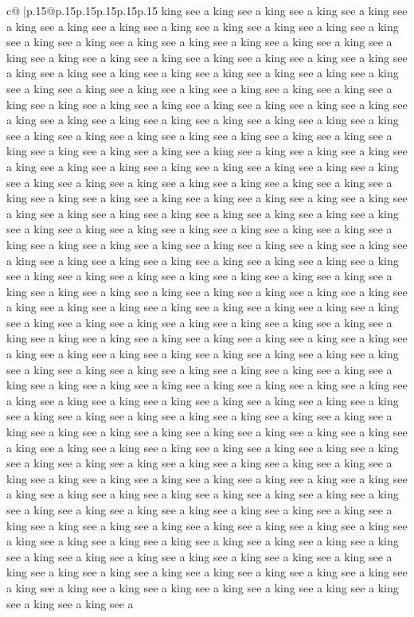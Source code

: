 \documentclass{article}
\begin{document}
{\begin{supertabular}{c@{$\;$}|p{.15\linewidth}@{}p{.15\linewidth}p{.15\linewidth}p{.15\linewidth}p{.15\linewidth}p{.15\linewidth}}
{{{king see a king see a king see a king see a king see a king see a king see a king see a king see a king see a king see a king see a king see a king see a king see a king see a king see a king see a king see a king see a king see a king see a king see a king see a king see a king see a king see a king see a king see a king see a king see a king see a king see a king see a king see a king see a king see a king see a king see a king see a king see a king see a king see a king see a king see a king see a king see a king see a king see a king see a king see a king see a king see a king see a king see a king see a king see a king see a king see a king see a king see a king see a king see a king see a king see a king see a king see a king see a king see a king see a king see a king see a king see a king see a king see a king see a king see a king see a king see a king see a king see a king see a king see a king see a king see a king see a king see a king see a king see a king see a king see a king see a king see a king see a king see a king see a king see a king see a king see a king see a king see a king see a king see a king see a king see a king see a king see a king see a king see a king see a king see a king see a king see a king see a king see a king see a king see a king see a king see a king see a king see a king see a king see a king see a king see a king see a king see a king see a king see a king see a king see a king see a king see a king see a king see a king see a king see a king see a king see a king see a king see a king see a king see a king see a king see a king see a king see a king see a king see a king see a king see a king see a king see a king see a king see a king see a king see a king see a king see a king see a king see a king see a king see a king see a king see a king see a king see a king see a king see a king see a king see a king see a king see a king see a king see a king see a king see a king see a king see a king see a king see a king see a king see a king see a king see a king see a king see a king see a king see a king see a king see a king see a king see a king see a king see a king see a king see a king see a king see a king see a king see a king see a king see a king see a king see a king see a king see a king see a king see a king see a king see a king see a king see a king see a king see a king see a king see a king see a king see a king see a king see a king see a king see a king see a king see a king see a king see a king see a king see a king see a king see a king see a king see a king see a king see a king see a king see a king see a king see a king see a king see a king see a king see a king see a king see a king see a king see a king see a king see a king see a king see a king see a king see a king see a king see a king see a king see a king see a king see a king see a king see a king see a king see a king see a king see a king see a king see a king see a king see a king see a king see a king see a king see a king see a king see a king see a king see a king see a king see a king see a king see a king see a king see a king see a king see a king see a king see a king see a king see a king see a king see a }}}
\end{supertabular}}
\end{document}
